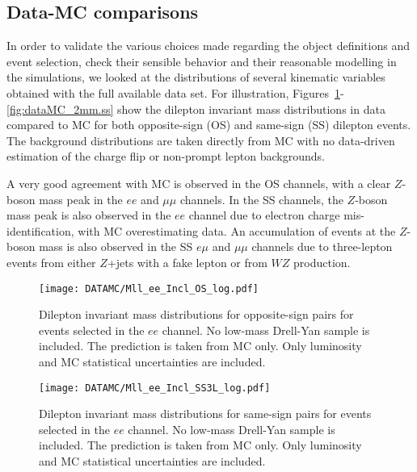 \subsection{Data-MC comparisons}
\label{subsec:sec.strategy.selection_DataMC}


In order to validate the various choices made regarding the object definitions and event selection, 
check their sensible behavior and their reasonable modelling in the simulations, 
we looked at the distributions of several kinematic variables obtained with the full available data set.
For illustration, Figures~\ref{fig:dataMC_2ee.os}-\ref{fig:dataMC_2mm.ss} show the dilepton invariant mass 
distributions in data compared to MC for both opposite-sign (OS) and same-sign (SS) dilepton events. 
The background distributions are taken directly from MC with no data-driven estimation of the charge flip or non-prompt lepton backgrounds.


A very good agreement with MC is observed in the OS channels, with a clear $Z$-boson mass peak in the $ee$ and $\mu\mu$ channels. 
In the SS channels, the $Z$-boson mass peak is also observed in the $ee$ channel due to electron charge mis-identification, with MC overestimating data. 
An accumulation of events at the $Z$-boson mass is also observed in the SS $e\mu$ and $\mu\mu$ channels due to three-lepton events 
from either $Z$+jets with a fake lepton or from $WZ$ production.  


\begin{figure}[htb!]
\centering
{\texttt{[image: DATAMC/Mll\_ee\_Incl\_OS\_log.pdf]}}
\caption{Dilepton invariant mass distributions for opposite-sign pairs for events selected in the $ee$ channel. 
No low-mass Drell-Yan sample is included. 
 The prediction is taken from MC only.
Only luminosity and MC statistical uncertainties are included.
}
\label{fig:dataMC_2ee.os}
\end{figure}


\begin{figure}[htb!]
\centering
{\texttt{[image: DATAMC/Mll\_ee\_Incl\_SS3L\_log.pdf]}}
\caption{Dilepton invariant mass distributions for same-sign pairs for events selected in the $ee$ channel. 
No low-mass Drell-Yan sample is included. 
 The prediction is taken from MC only.
Only luminosity and MC statistical uncertainties are included.
}
\label{fig:dataMC_2ee.ss}
\end{figure}


